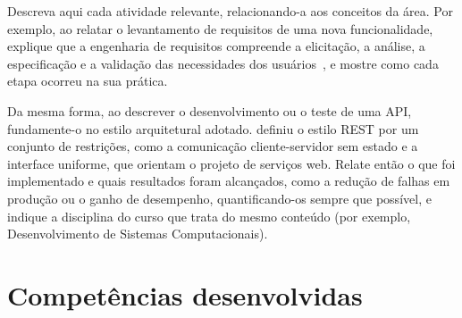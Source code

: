 \documentclass[memorial,capa]{texifsap}
\begin{document}
%
%

Descreva aqui cada atividade relevante, relacionando-a aos conceitos da
área. Por exemplo, ao relatar o levantamento de requisitos de uma nova
funcionalidade, explique que a engenharia de requisitos compreende a
elicitação, a análise, a especificação e a validação das necessidades
dos usuários~\cite{Sommerville:2019}, e mostre como cada etapa ocorreu na
sua prática.

Da mesma forma, ao descrever o desenvolvimento ou o teste de uma API,
fundamente-o no estilo arquitetural adotado. \citet{Fielding:2000}
definiu o estilo REST por um conjunto de restrições, como a comunicação
cliente-servidor sem estado e a interface uniforme, que orientam o
projeto de serviços web. Relate então o que foi implementado e quais
resultados foram alcançados, como a redução de falhas em produção ou o
ganho de desempenho, quantificando-os sempre que possível, e indique a
disciplina do curso que trata do mesmo conteúdo (por exemplo,
Desenvolvimento de Sistemas Computacionais).

\section{Competências desenvolvidas}
\end{document}

